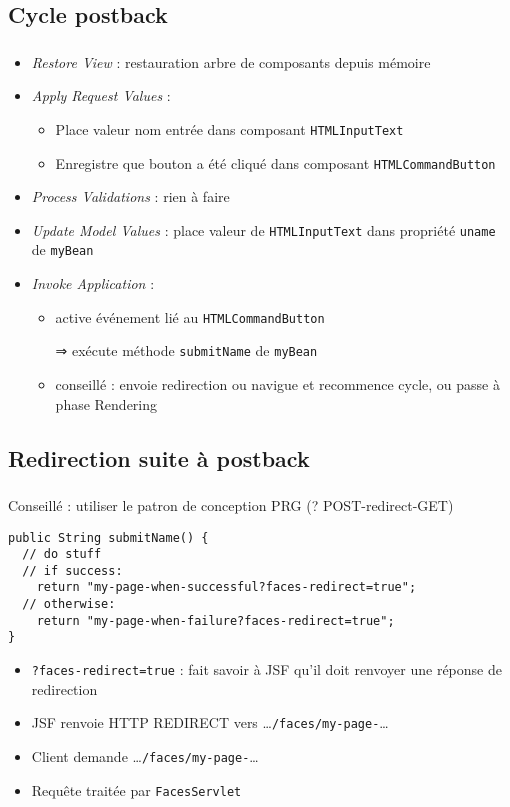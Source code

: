 \documentclass[english, french]{beamer}
\begin{document}
\subsection{Cycle postback}
\begin{frame}
	\frametitle{\subsecname}	
	\begin{itemize}
		\item \emph{Restore View} : restauration arbre de composants depuis mémoire
		\item \emph{Apply Request Values} :
		\begin{itemize}
			\item Place valeur nom entrée dans composant \texttt{HTMLInputText}
			\item Enregistre que bouton a été cliqué dans composant \texttt{HTMLCommandButton}
		\end{itemize}
		\item \emph{Process Validations} : rien à faire
		\item \emph{Update Model Values} : place valeur de \texttt{HTMLInputText} dans propriété \texttt{uname} de \texttt{myBean}
		\item \emph{Invoke Application} :
		\begin{itemize}
			\item active événement lié au \texttt{HTMLCommandButton}
			\item[⇒] exécute méthode \texttt{submitName} de \texttt{myBean}
			\item conseillé : envoie redirection {\tiny ou navigue et recommence cycle, ou passe à phase Rendering}
		\end{itemize}
	\end{itemize}
\end{frame}

\subsection{Redirection suite à postback}
\begin{frame}[fragile]
	\frametitle{\subsecname}
	Conseillé : utiliser le patron de conception PRG (? \pause POST-redirect-GET) \pause
	\vspace{1em}
	\begin{lstlisting}
public String submitName() {
  // do stuff
  // if success:
    return "my-page-when-successful?faces-redirect=true";
  // otherwise:
    return "my-page-when-failure?faces-redirect=true";
}
	\end{lstlisting}
	\begin{itemize}
		\item \texttt{?faces-redirect=true} : fait savoir à JSF qu’il doit renvoyer une réponse de redirection
		\item JSF renvoie HTTP REDIRECT vers …\texttt{/faces/my-page-}…
		\item Client demande …\texttt{/faces/my-page-}…
		\item Requête traitée par \texttt{FacesServlet}
	\end{itemize}
\end{frame}
\end{document}

